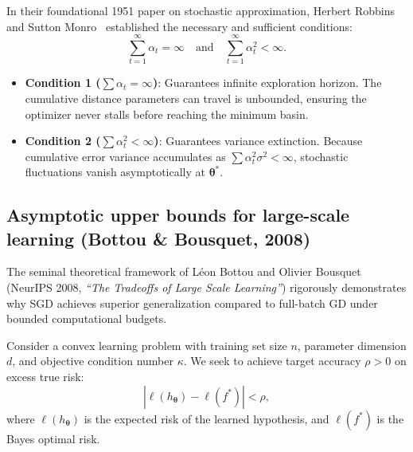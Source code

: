 In their foundational 1951 paper on stochastic approximation, Herbert Robbins and Sutton Monro~\cite{robbins1951stochastic} established the necessary and sufficient conditions:
\begin{equation}
\sum_{t=1}^\infty \alpha_t = \infty \quad \text{and} \quad \sum_{t=1}^\infty \alpha_t^2 < \infty.
\label{eq:robbins_monro_conditions}
\end{equation}
\begin{itemize}[noitemsep]
  \item \textbf{Condition 1 ($\sum \alpha_t = \infty$)}: Guarantees infinite exploration horizon. The cumulative distance parameters can travel is unbounded, ensuring the optimizer never stalls before reaching the minimum basin.
  \item \textbf{Condition 2 ($\sum \alpha_t^2 < \infty$)}: Guarantees variance extinction. Because cumulative error variance accumulates as $\sum \alpha_t^2 \sigma^2 < \infty$, stochastic fluctuations vanish asymptotically at $\boldsymbol{\theta}^*$.
\end{itemize}

\subsection{Asymptotic upper bounds for large-scale learning (Bottou \& Bousquet, 2008)}
\label{sec:bottou_bousquet_bounds}

The seminal theoretical framework of Léon Bottou and Olivier Bousquet~\cite{bottou2008tradeoffs} (NeurIPS 2008, \emph{``The Tradeoffs of Large Scale Learning''}) rigorously demonstrates why SGD achieves superior generalization compared to full-batch GD under bounded computational budgets.

Consider a convex learning problem with training set size $n$, parameter dimension $d$, and objective condition number $\kappa$. We seek to achieve target accuracy $\rho > 0$ on excess true risk:
\begin{equation}
\left| \ell(h_{\boldsymbol{\theta}}) - \ell(f^*) \right| < \rho,
\label{eq:excess_risk_target}
\end{equation}
where $\ell(h_{\boldsymbol{\theta}})$ is the expected risk of the learned hypothesis, and $\ell(f^*)$ is the Bayes optimal risk.

